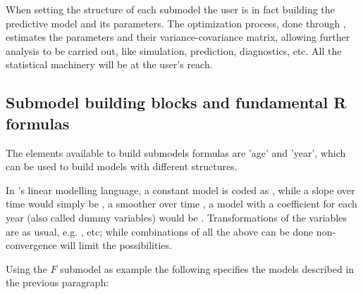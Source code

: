 \documentclass[a4paper,english,11pt]{article}
\begin{document}
When setting the structure of each submodel the user is in fact building the predictive model and its parameters. The optimization process, done through \ADMB, estimates the parameters and their variance-covariance matrix, allowing further analysis to be carried out, like simulation, prediction, diagnostics, etc. All the statistical machinery will be at the user's reach.

\subsection{Submodel building blocks and fundamental R formulas}

The elements available to build submodels formulas are 'age' and 'year', which can be used to build models with different structures. 

In \R's linear modelling language, a constant model is coded as , while a slope over time would simply be , a smoother over time , a model with a coefficient for each year (also called dummy variables) would be . Transformations of the variables are as usual, e.g. , etc; while combinations of all the above can be done non-convergence will limit the possibilities. 

Using the $F$ submodel as example the following specifies the models described in the previous paragraph:
\end{document}
